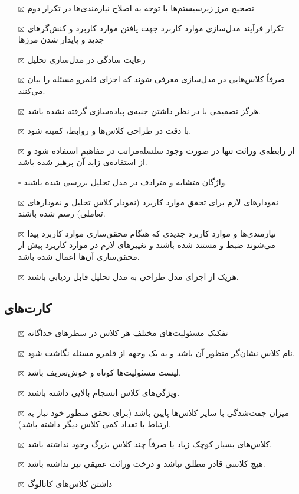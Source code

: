\begin{itemize} \setlength\itemsep{0cm}
	\item[$\boxtimes$]
	تصحیح مرز زیرسیستم‌ها با توجه به اصلاح نیازمندی‌ها در تکرار دوم
	\item[$\boxtimes$]
	تکرار فرآیند مدل‌سازی موارد کاربرد جهت یافتن موارد کاربرد و کنش‌گرهای جدید و پایدار شدن مرزها
	\item[$\boxtimes$]
	رعایت سادگی در مدل‌سازی تحلیل
	\item[$\boxtimes$]
	صرفاً کلاس‌هایی در مدل‌سازی معرفی شوند که اجزای قلمرو مسئله را بیان می‌کنند.
	\item[$\boxtimes$]
	هرگز تصمیمی با در نظر داشتن جنبه‌ی پیاده‌سازی گرفته نشده باشد.
	\item[$\boxtimes$]
	با دقت در طراحی کلاس‌ها و روابط،  کمینه شود.
	\item[$\boxtimes$]
	از رابطه‌ی وراثت تنها در صورت وجود سلسله‌مراتب در مفاهیم استفاده شود و از استفاده‌ی زاید آن پرهیز شده باشد.
	\item[$\square$]
	واژگان متشابه و مترادف در مدل تحلیل بررسی شده باشند.
	\item[$\boxtimes$]
	نمودارهای لازم برای تحقق موارد کاربرد (نمودار کلاس تحلیل و نمودارهای تعاملی) رسم شده باشند.
	\item[$\boxtimes$]
	نیازمندی‌ها و موارد کاربرد جدیدی که هنگام محقق‌سازی موارد کاربرد پیدا می‌شوند ضبط و مستند شده باشند و تغییرهای لازم در موارد کاربرد پیش از محقق‌سازی آن‌ها اعمال شده باشد.
	\item[$\boxtimes$]
	هریک از اجزای مدل طراحی به مدل تحلیل قابل ردیابی باشند.

\end{itemize}

\subsection{کارت‌های }

\begin{itemize} \setlength\itemsep{0cm}
	\item[$\boxtimes$]
	تفکیک مسئولیت‌های مختلف هر کلاس در سطرهای جداگانه
	\item[$\boxtimes$]
	نام کلاس نشان‌گر منظور آن باشد و به یک وجهه از قلمرو مسئله نگاشت شود.
	\item[$\boxtimes$]
	لیست مسئولیت‌ها کوتاه و خوش‌تعریف باشد.
	\item[$\boxtimes$]
	ویژگی‌های کلاس انسجام بالایی داشته باشند.
	\item[$\boxtimes$]
	میزان جفت‌شدگی با سایر کلاس‌ها پایین باشد (برای تحقق منظور خود نیاز به ارتباط با تعداد کمی کلاس دیگر داشته باشد).
	\item[$\boxtimes$]
	کلاس‌های بسیار کوچک زیاد یا صرفاً چند کلاس بزرگ وجود نداشته باشد.
	\item[$\boxtimes$]
	هیچ کلاسی قادر مطلق نباشد و درخت وراثت عمیقی نیز نداشته باشد.
	\item[$\boxtimes$]
	داشتن کلاس‌های کاتالوگ
\end{itemize}

